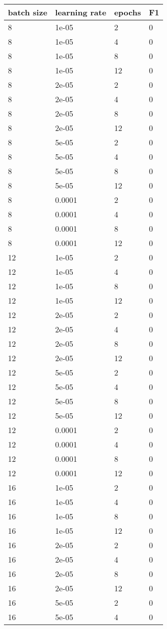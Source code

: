 \documentclass{article}%
\begin{document}
%
\normalsize%
\begin{longtable}{l l l l}%
\hline%
batch size&learning rate&epochs&F1\\%
\hline%
\endhead%
\hline%
8&1e{-}05&2&0\\%
8&1e{-}05&4&0\\%
8&1e{-}05&8&0\\%
8&1e{-}05&12&0\\%
8&2e{-}05&2&0\\%
8&2e{-}05&4&0\\%
8&2e{-}05&8&0\\%
8&2e{-}05&12&0\\%
8&5e{-}05&2&0\\%
8&5e{-}05&4&0\\%
8&5e{-}05&8&0\\%
8&5e{-}05&12&0\\%
8&0.0001&2&0\\%
8&0.0001&4&0\\%
8&0.0001&8&0\\%
8&0.0001&12&0\\%
12&1e{-}05&2&0\\%
12&1e{-}05&4&0\\%
12&1e{-}05&8&0\\%
12&1e{-}05&12&0\\%
12&2e{-}05&2&0\\%
12&2e{-}05&4&0\\%
12&2e{-}05&8&0\\%
12&2e{-}05&12&0\\%
12&5e{-}05&2&0\\%
12&5e{-}05&4&0\\%
12&5e{-}05&8&0\\%
12&5e{-}05&12&0\\%
12&0.0001&2&0\\%
12&0.0001&4&0\\%
12&0.0001&8&0\\%
12&0.0001&12&0\\%
16&1e{-}05&2&0\\%
16&1e{-}05&4&0\\%
16&1e{-}05&8&0\\%
16&1e{-}05&12&0\\%
16&2e{-}05&2&0\\%
16&2e{-}05&4&0\\%
16&2e{-}05&8&0\\%
16&2e{-}05&12&0\\%
16&5e{-}05&2&0\\%
16&5e{-}05&4&0\\%

\end{longtable}
\end{document}
